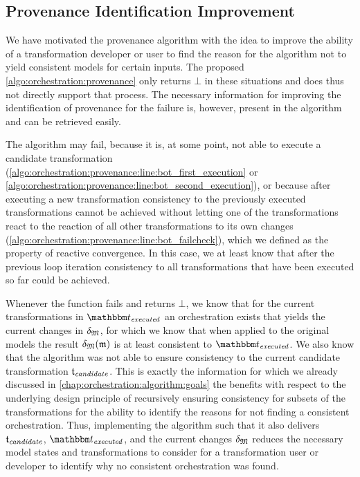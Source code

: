 \subsection{Provenance Identification Improvement}

We have motivated the provenance algorithm with the idea to improve the ability of a transformation developer or user to find the reason for the algorithm not to yield consistent models for certain inputs.
The proposed \autoref{algo:orchestration:provenance} only returns $\bot$ in these situations and does thus not directly support that process.
The necessary information for improving the identification of provenance for the failure is, however, present in the algorithm and can be retrieved easily.

The algorithm may fail, because it is, at some point, not able to execute a candidate transformation (\autoref{algo:orchestration:provenance:line:bot_first_execution} or \autoref{algo:orchestration:provenance:line:bot_second_execution}), or because after executing a new transformation consistency to the previously executed transformations cannot be achieved without letting one of the transformations react to the reaction of all other transformations to its own changes (\autoref{algo:orchestration:provenance:line:bot_failcheck}), which we defined as the property of reactive convergence.
In this case, we at least know that after the previous loop iteration consistency to all transformations that have been executed so far could be achieved.

Whenever the  function fails and returns $\bot$, we know that for the current transformations in $\provalgexecuted$ an orchestration exists that yields the current changes in $\changetuple{\metamodeltuple{M}}$, for which we know that when applied to the original models the result $\changetuple{\metamodeltuple{M}}(\modeltuple{m})$ is at least consistent to $\provalgexecuted$.
We also know that the algorithm was not able to ensure consistency to the current candidate transformation $\provalgcandidate$.
This is exactly the information for which we already discussed in \autoref{chap:orchestration:algorithm:goals} the benefits with respect to the underlying design principle of recursively ensuring consistency for subsets of the transformations for the ability to identify the reasons for not finding a consistent orchestration.
Thus, implementing the algorithm such that it also delivers $\provalgcandidate$, $\provalgexecuted$, and the current changes $\changetuple{\metamodeltuple{M}}$ reduces the necessary model states and transformations to consider for a transformation user or developer to identify why no consistent orchestration was found.

